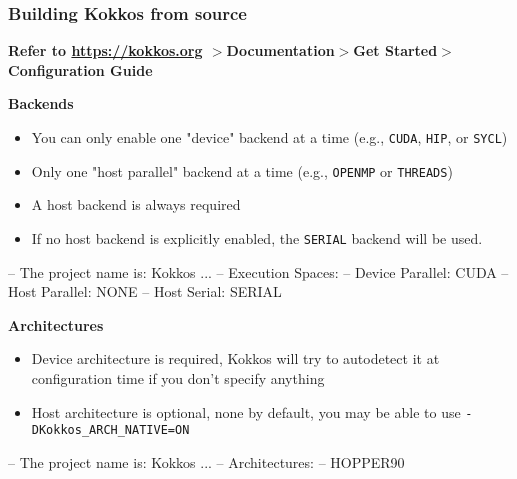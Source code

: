 \begin{frame}[fragile]
\frametitle{Building Kokkos from source}

\scriptsize

\textbf{Refer to \url{https://kokkos.org} $>$Documentation$>$Get Started$>$Configuration Guide}


\vspace{1eM}
\textbf{Backends}
\begin{itemize}
\item You can only enable one "device" backend at a time (e.g., \texttt{CUDA}, \texttt{HIP}, or \texttt{SYCL})
\item Only one "host parallel" backend at a time (e.g., \texttt{OPENMP} or \texttt{THREADS})
\item A host backend is always required
\item If no host backend is explicitly enabled, the \texttt{SERIAL} backend will be used.
\end{itemize}

\begin{shell}[linebackground={
  \btLstHL{4}{orange!30},},
  basicstyle=\tiny\ttfamily,]
-- The project name is: Kokkos
...
-- Execution Spaces:
--     Device Parallel: CUDA
--     Host Parallel: NONE
--       Host Serial: SERIAL
\end{shell}

\textbf{Architectures}
\begin{itemize}
\item Device architecture is required, Kokkos will try to autodetect it at configuration time if you don't specify anything
\item Host architecture is optional, none by default, you may be able to use \texttt{-DKokkos_ARCH_NATIVE=ON}
\end{itemize}
\begin{shell}[linebackground={
  \btLstHL{4}{orange!30},},
  basicstyle=\tiny\ttfamily,]
-- The project name is: Kokkos
...
-- Architectures:
--  HOPPER90
\end{shell}

\end{frame}

